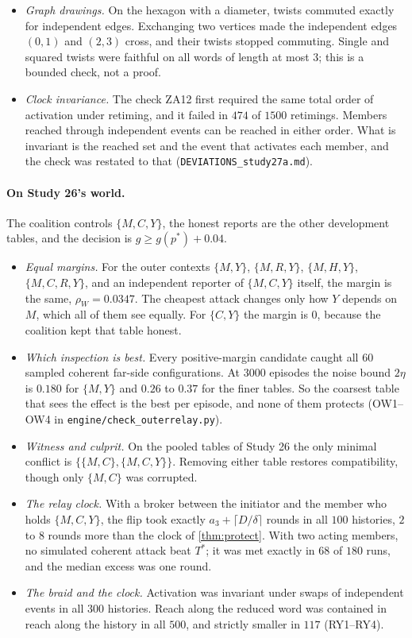 \documentclass[11pt]{article}
\theoremstyle{definition}\newtheorem{definition}[theorem]{Definition}\newtheorem{remark}[theorem]{Remark}\newtheorem{example}[theorem]{Example}\newtheorem{problem}[theorem]{Open problem}\crefname{problem}{Problem}{Problems}
\begin{document}
\begin{itemize}
\item \emph{Graph drawings.} On the hexagon with a diameter, twists commuted exactly for independent edges. Exchanging two vertices made the independent edges $(0,1)$ and $(2,3)$ cross, and their twists stopped commuting. Single and squared twists were faithful on all words of length at most $3$; this is a bounded check, not a proof.
\item \emph{Clock invariance.} The check ZA12 first required the same total order of activation under retiming, and it failed in $474$ of $1500$ retimings. Members reached through independent events can be reached in either order. What is invariant is the reached set and the event that activates each member, and the check was restated to that (\texttt{DEVIATIONS\_study27a.md}).
\end{itemize}

\paragraph{On Study 26's world.} The coalition controls $\{M,C,Y\}$, the honest reports are the other development tables, and the decision is $g\ge g(p^\ast)+0.04$.
\begin{itemize}
\item \emph{Equal margins.} For the outer contexts $\{M,Y\}$, $\{M,R,Y\}$, $\{M,H,Y\}$, $\{M,C,R,Y\}$, and an independent reporter of $\{M,C,Y\}$ itself, the margin is the same, $\rho_W=0.0347$. The cheapest attack changes only how $Y$ depends on $M$, which all of them see equally. For $\{C,Y\}$ the margin is $0$, because the coalition kept that table honest.
\item \emph{Which inspection is best.} Every positive-margin candidate caught all $60$ sampled coherent far-side configurations. At $3000$ episodes the noise bound $2\eta$ is $0.180$ for $\{M,Y\}$ and $0.26$ to $0.37$ for the finer tables. So the coarsest table that sees the effect is the best per episode, and none of them protects (OW1--OW4 in \texttt{engine/check\_outerrelay.py}).
\item \emph{Witness and culprit.} On the pooled tables of Study 26 the only minimal conflict is $\{\{M,C\},\{M,C,Y\}\}$. Removing either table restores compatibility, though only $\{M,C\}$ was corrupted.
\item \emph{The relay clock.} With a broker between the initiator and the member who holds $\{M,C,Y\}$, the flip took exactly $a_3+\lceil D/\delta\rceil$ rounds in all $100$ histories, $2$ to $8$ rounds more than the clock of \cref{thm:protect}. With two acting members, no simulated coherent attack beat $T^\ast$; it was met exactly in $68$ of $180$ runs, and the median excess was one round.
\item \emph{The braid and the clock.} Activation was invariant under swaps of independent events in all $300$ histories. Reach along the reduced word was contained in reach along the history in all $500$, and strictly smaller in $117$ (RY1--RY4).
\end{itemize}
\end{document}
